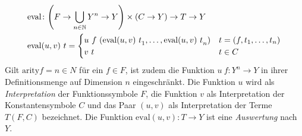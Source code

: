 \begin{equation*}
    \begin{split}
	\mathrm{eval} &\colon \paren*{F \rightarrow \bigcup_{n \in \mathbb{N}} Y^n \rightarrow Y} \times (C \rightarrow Y) \rightarrow T \rightarrow Y\\
	\mathrm{eval} &(u, v)~t = \begin{cases}
		u~f~(\elems {\mathrm{eval}(u, v)~t} 1 n) & t = (f, \tOneN)\\
		v~t                                      & t \in C\\
		\end{cases}
    \end{split}
\end{equation*}
Gilt $\mathrm{arity} f = n \in N$ für ein $f \in F$, ist zudem die Funktion $u~f \colon Y^n \rightarrow Y$ in ihrer Definitionsmenge auf Dimension $n$ eingeschränkt. 
Die Funktion $u$ wird als \emph{Interpretation} der Funktionssymbole $F$, die Funktion $v$ als Interpretation der Konstantensymbole $C$ und das Paar $(u, v)$ als Interpretation der Terme $T(F, C)$ bezeichnet. Die Funktion $\mathrm{eval}(u, v) \colon T \rightarrow Y$ ist eine \emph{Auswertung} nach $Y$. 
\\~\\

